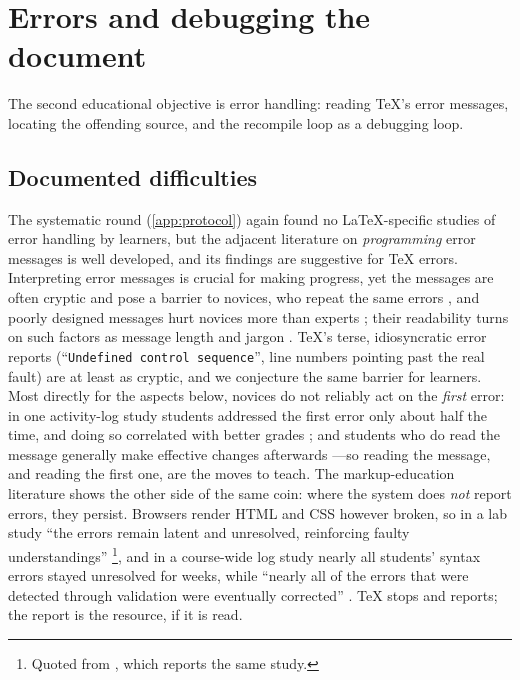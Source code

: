 \mode*
\section{Errors and debugging the document}
\label{sec:errors}

The second educational objective is error handling: reading TeX's error
messages, locating the offending source, and the recompile loop as a
debugging loop.

\subsection{Documented difficulties}

The systematic round (\cref{app:protocol}) again found no LaTeX-specific
studies of error handling by learners, but the adjacent literature on
\emph{programming} error messages is well developed, and its findings are
suggestive for TeX errors.
Interpreting error messages is crucial for making progress, yet the
messages are often cryptic and pose a barrier to novices, who repeat the
same errors \autocite{Becker2016CEM,Traver2010CompilerErrors}, and poorly
designed messages hurt novices more than experts
\autocite{Traver2010CompilerErrors}; their readability turns on such
factors as message length and jargon \autocite{Denny2021ErrorReadability}.
TeX's terse, idiosyncratic error reports (\enquote{\texttt{Undefined
control sequence}}, line numbers pointing past the real fault) are at
least as cryptic, and we conjecture the same barrier for learners.
Most directly for the aspects below, novices do not reliably act on the
\emph{first} error: in one activity-log study students addressed the first
error only about half the time, and doing so correlated with better grades
\autocite{Munson2016CompilerErrors}; and students who do read the message
generally make effective changes afterwards
\autocite{Prather2017Interaction}---so reading the message, and reading the
first one, are the moves to teach.
The markup-education literature shows the other side of the same coin:
where the system does \emph{not} report errors, they persist.
Browsers render HTML and CSS however broken, so in a lab study
\enquote{the errors remain latent and unresolved, reinforcing faulty
understandings} \autocite{Park2013ErrorTaxonomy}\footnote{Quoted from
\textcite[pp.~107--108]{Park2014openHTML}, which reports the same
study.}, and in a course-wide log study nearly all students' syntax errors
stayed unresolved for weeks, while \enquote{nearly all of the errors that
were detected through validation were eventually corrected}
\autocite{Park2015SyntaxErrors}.
TeX stops and reports; the report is the resource, if it is read.

